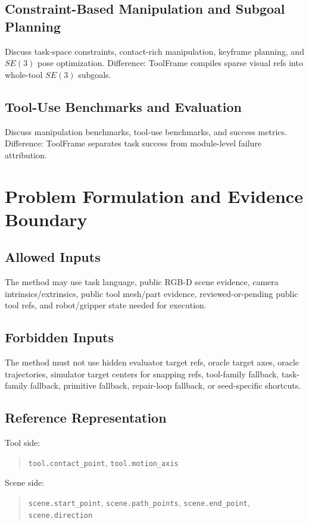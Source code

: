 \documentclass[journal]{IEEEtran}
\newcommand{\method}{ToolFrame}
\begin{document}
\subsection{Constraint-Based Manipulation and Subgoal Planning}
Discuss task-space constraints, contact-rich manipulation, keyframe planning,
and $SE(3)$ pose optimization. Difference: \method{} compiles sparse visual
refs into whole-tool $SE(3)$ subgoals.

\subsection{Tool-Use Benchmarks and Evaluation}
Discuss manipulation benchmarks, tool-use benchmarks, and success metrics.
Difference: \method{} separates task success from module-level failure
attribution.

\section{Problem Formulation and Evidence Boundary}
\subsection{Allowed Inputs}
The method may use task language, public RGB-D scene evidence, camera
intrinsics/extrinsics, public tool mesh/part evidence, reviewed-or-pending
public tool refs, and robot/gripper state needed for execution.

\subsection{Forbidden Inputs}
The method must not use hidden evaluator target refs, oracle target axes,
oracle trajectories, simulator target centers for snapping refs, tool-family
fallback, task-family fallback, primitive fallback, repair-loop fallback, or
seed-specific shortcuts.

\subsection{Reference Representation}
Tool side:
\begin{quote}
\texttt{tool.contact\_point}, \texttt{tool.motion\_axis}
\end{quote}

Scene side:
\begin{quote}
\texttt{scene.start\_point}, \texttt{scene.path\_points},
\texttt{scene.end\_point}, \texttt{scene.direction}
\end{quote}
\end{document}
